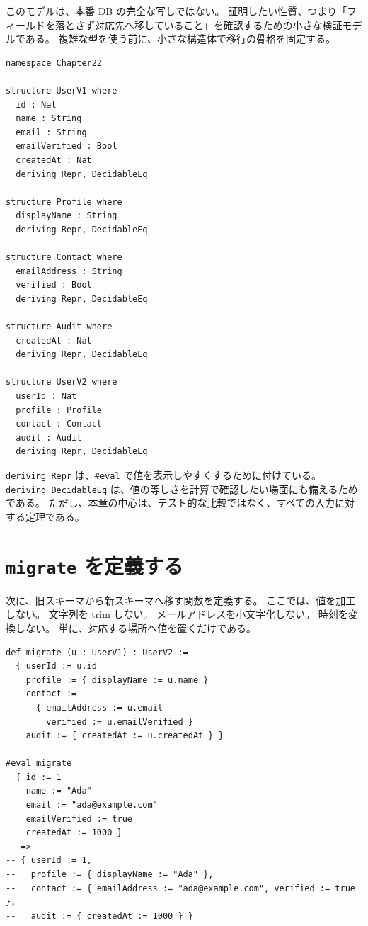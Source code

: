\begin{leanbox}
このモデルは、本番 DB の完全な写しではない。
証明したい性質、つまり「フィールドを落とさず対応先へ移していること」を確認するための小さな検証モデルである。
複雑な型を使う前に、小さな構造体で移行の骨格を固定する。
\end{leanbox}

\begin{listing}[htbp]
\begin{verbatim}
namespace Chapter22

structure UserV1 where
  id : Nat
  name : String
  email : String
  emailVerified : Bool
  createdAt : Nat
  deriving Repr, DecidableEq

structure Profile where
  displayName : String
  deriving Repr, DecidableEq

structure Contact where
  emailAddress : String
  verified : Bool
  deriving Repr, DecidableEq

structure Audit where
  createdAt : Nat
  deriving Repr, DecidableEq

structure UserV2 where
  userId : Nat
  profile : Profile
  contact : Contact
  audit : Audit
  deriving Repr, DecidableEq
\end{verbatim}
\caption{旧スキーマと新スキーマの定義}
\label{lst:ch22-schema-defs}
\end{listing}

\texttt{deriving Repr} は、\texttt{\#eval} で値を表示しやすくするために付けている。
\texttt{deriving DecidableEq} は、値の等しさを計算で確認したい場面にも備えるためである。
ただし、本章の中心は、テスト的な比較ではなく、すべての入力に対する定理である。

\section{\texttt{migrate} を定義する}

次に、旧スキーマから新スキーマへ移す関数を定義する。
ここでは、値を加工しない。
文字列を trim しない。
メールアドレスを小文字化しない。
時刻を変換しない。
単に、対応する場所へ値を置くだけである。

\begin{listing}[htbp]
\begin{verbatim}
def migrate (u : UserV1) : UserV2 :=
  { userId := u.id
    profile := { displayName := u.name }
    contact :=
      { emailAddress := u.email
        verified := u.emailVerified }
    audit := { createdAt := u.createdAt } }

#eval migrate
  { id := 1
    name := "Ada"
    email := "ada@example.com"
    emailVerified := true
    createdAt := 1000 }
-- =>
-- { userId := 1,
--   profile := { displayName := "Ada" },
--   contact := { emailAddress := "ada@example.com", verified := true },
--   audit := { createdAt := 1000 } }
\end{verbatim}
\caption{旧スキーマから新スキーマへの移行}
\label{lst:ch22-migrate}
\end{listing}

